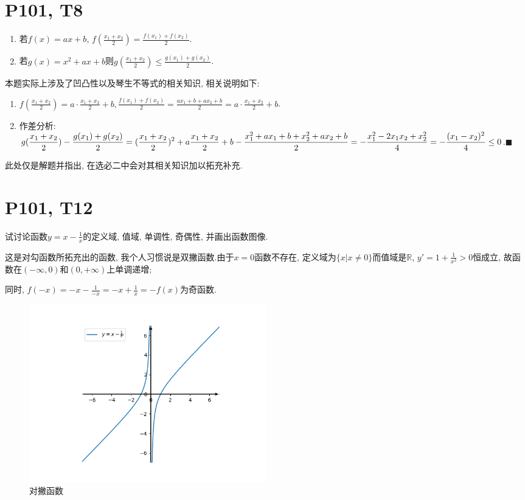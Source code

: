 \documentclass{book}
\begin{document}
    \section{\textcolor[rgb]{0.11,0.65,0.52}{P101, T8}}
    \begin{boxB}
        \begin{enumerate}
            \item 若$f(x)=ax+b$, $\displaystyle f(\frac{x_1+x_2}{2})=\frac{f(x_1)+f(x_2)}{2}$.
            \item 若$g(x)=x^2+ax+b$则$\displaystyle g(\frac{x_1+x_2}{2})\le \frac{g(x_1)+g(x_2)}{2}$.
        \end{enumerate}
    \end{boxB}
    本题实际上涉及了\textcolor[rgb]{0.38,0.11,0.2}{凹凸性}以及\textcolor[rgb]{0.38,0.11,0.2}{琴生不等式}的相关知识, 相关说明如下:
    \begin{enumerate}
        \doublespacing
        \item $\displaystyle f(\frac{x_1+x_2}{2})=a\cdot \frac{x_1+x_2}{2}+b, \frac{f(x_1)+f(x_2)}{2}=\frac{ax_1+b+ax_2+b}{2}=a\cdot \frac{x_1+x_2}{2}+b$.
        \item \textcolor[rgb]{0.75,0.17,0.22}{作差分析}: $\displaystyle g(\frac{x_1+x_2}{2})-\frac{g(x_1)+g(x_2)}{2}\\=(\frac{x_1+x_2}{2})^2+a\frac{x_1+x_2}{2}+b-\frac{x_1^2+ax_1+b+x_2^2+ax_2+b}{2}\\=-\frac{x_1^2-2x_1x_2+x_2^2}{4}=-\frac{(x_1-x_2)^2}{4}\le 0$.$\blacksquare$
    \end{enumerate}
    此处仅是解题并指出, 在选必二中会对其相关知识加以拓充补充.
    \section{\textcolor[rgb]{0.11,0.65,0.52}{P101, T12}}
    \begin{boxB}
        试讨论函数$\displaystyle y=x-\frac{1}{x}$的定义域, 值域, 单调性, 奇偶性, 并画出函数图像.
    \end{boxB}
    这是对勾函数所拓充出的函数, 我个人习惯说是双撇函数.由于$x=0$函数不存在, 定义域为$\{x|x\neq 0\}$而值域是$\mathbb{R}$, $y'=1+\frac{1}{x^2}>0$恒成立, 故函数在$(-\infty ,0)$和$(0,+\infty )$上单调递增;

    同时, $\displaystyle f(-x)=-x-\frac{1}{-x}=-x+\frac{1}{x}=-f(x)$为奇函数.
    \begin{figure}[htbp]
        \centering
        \includegraphics[width=0.5\textwidth]{img/sp.png}
        \caption{对撇函数}
    \end{figure}
\end{document}
